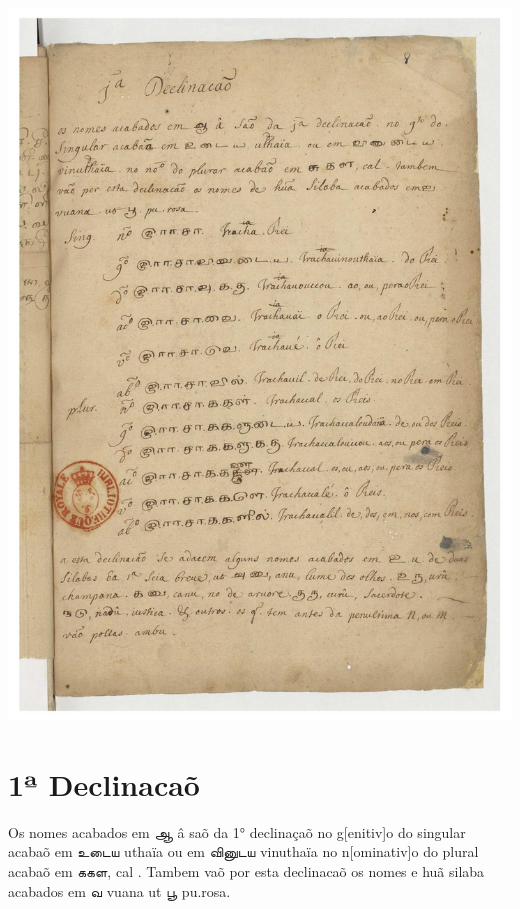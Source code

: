 \documentclass[12pt,a4paper]{scrbook}
\begin{document}
\newpage
\hypertarget{img-25}{
    \includegraphics[width=\textwidth]{img-25}}
\newpage
      \chapter*{1ª Declinacaõ}
    
      

Os nomes acabados em ஆ â saõ da 1° declinaçaõ no g[enitiv]o do 
            singular acabaõ em உடைய uthaïa ou em வினுடய
            vinuthaïa no n[ominativ]o do plural acabaõ em ககள, cal . Tambem
            vaõ por esta declinacaõ os nomes e huã silaba acabados em வ
            vuana ut பூ pu.rosa. 
        
\end{document}
